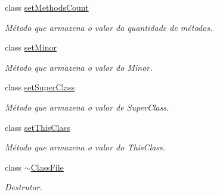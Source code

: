 \begin{DoxyCompactItemize}
class \hyperlink{classClassFile_1_1setMethodsCount}{set\+Methods\+Count}
\begin{DoxyCompactList}\small\item\em Método que armazena o valor da quantidade de métodos. \end{DoxyCompactList}\item 
class \hyperlink{classClassFile_1_1setMinor}{set\+Minor}
\begin{DoxyCompactList}\small\item\em Método que armazena o valor do Minor. \end{DoxyCompactList}\item 
class \hyperlink{classClassFile_1_1setSuperClass}{set\+Super\+Class}
\begin{DoxyCompactList}\small\item\em Método que armazena o valor de Super\+Class. \end{DoxyCompactList}\item 
class \hyperlink{classClassFile_1_1setThisClass}{set\+This\+Class}
\begin{DoxyCompactList}\small\item\em Método que armazena o valor do This\+Class. \end{DoxyCompactList}\item 
class \hyperlink{classClassFile_1_1~ClassFile}{$\sim$\+Class\+File}
\begin{DoxyCompactList}\small\item\em Destrutor. \end{DoxyCompactList}\end{DoxyCompactItemize}

